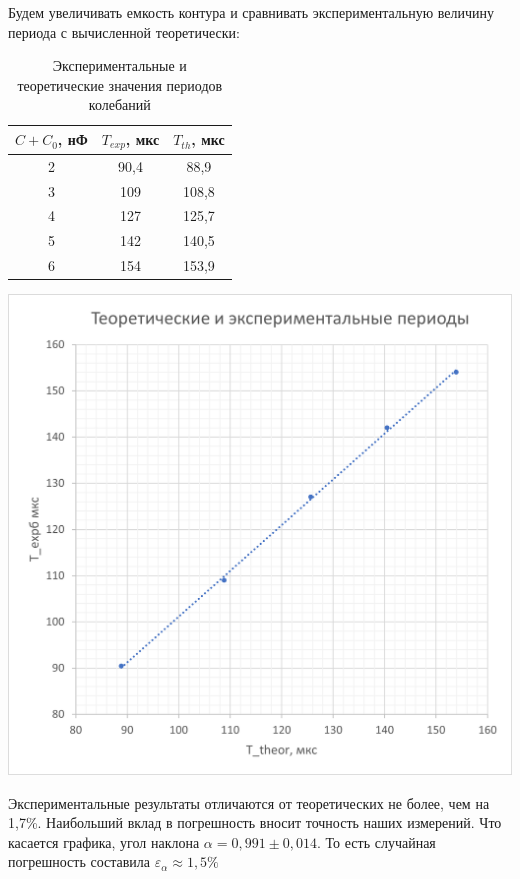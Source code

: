 \documentclass[a4paper, 12pt]{article}
\begin{document}
	Будем увеличивать емкость контура и сравнивать экспериментальную величину периода с вычисленной теоретически: 
	
	\begin{table}[h]
		\centering
		\begin{tabular}{|c|c|c|}
		\hline
		$C + C_0$, нФ & $T_{exp}$, мкс & $T_{th}$, мкс \\ \hline
		2 & 90,4 & 88,9 \\
		3 & 109 & 108,8 \\
		4 & 127 & 125,7 \\
		5 & 142 & 140,5 \\
		6 & 154 & 153,9 \\
		\hline
		\end{tabular}
		\caption{Экспериментальные и теоретические значения периодов колебаний}
	\end{table}
	
	\begin{center}
		\includegraphics{Gr1}
	\end{center}
	
	Экспериментальные результаты отличаются от теоретических не более, чем на 1,7\%. Наибольший вклад в погрешность вносит точность наших измерений. Что касается графика, угол наклона $\alpha = 0,991 \pm 0,014$. То есть случайная погрешность составила $\varepsilon_{\alpha} \approx 1,5 \%$
	
\end{document}
